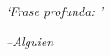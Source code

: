 \clearpage

\narrowlinespacing

\vspace*{9cm}

 
\begin{flushright}
	\textit{`Frase profunda: \blindtext[1]'}

\emph{--Alguien}

\end{flushright}


\normallinespacing